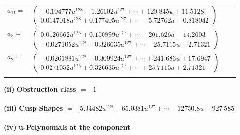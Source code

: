 \documentclass[1p]{elsarticle_modified}
\theoremstyle{definition}
\begin{document}
\begin{tabular}{m{7pt} m{180pt} m{7pt} m{180pt} }
\flushright $a_{11}=$&$\begin{pmatrix}-0.104777 u^{128}-1.26102 u^{127}+\cdots+120.845 u+11.5128\\0.0147018 u^{128}+0.177405 u^{127}+\cdots-5.72762 u-0.818042\end{pmatrix}$ \\
\flushright $a_{5}=$&$\begin{pmatrix}0.0126662 u^{128}+0.150899 u^{127}+\cdots-201.626 u-14.2603\\-0.0271052 u^{128}-0.326635 u^{127}+\cdots-25.7115 u-2.71321\end{pmatrix}$ \\
\flushright $a_{2}=$&$\begin{pmatrix}-0.0261881 u^{128}-0.309924 u^{127}+\cdots+241.686 u+17.6947\\0.0271052 u^{128}+0.326635 u^{127}+\cdots+25.7115 u+2.71321\end{pmatrix}$\\&\end{tabular}
\flushleft \textbf{(ii) Obstruction class $= -1$}\\~\\
\flushleft \textbf{(iii) Cusp Shapes $= -5.34482 u^{128}-65.0381 u^{127}+\cdots-12750.8 u-927.585$}\\~\\
\newpage\renewcommand{\arraystretch}{1}
\flushleft \textbf{(iv) u-Polynomials at the component}\newline \\
\end{document}
